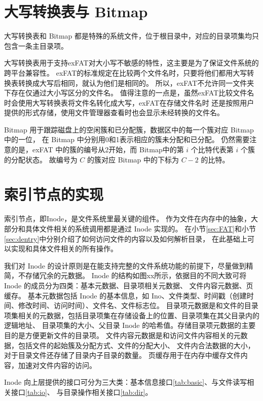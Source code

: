 \section{大写转换表与 Bitmap}
大写转换表和 Bitmap 都是特殊的系统文件，位于根目录中，对应的目录项集均只包含一条主目录项。

大写转换表用于支持exFAT对大小写不敏感的特性，这主要是为了保证文件系统的跨平台兼容性。
exFAT的标准规定在比较两个文件名时，只要将他们都用大写转换表转换成大写后相同，就认为他们是相同的。
所以，exFAT不允许同一文件夹下存在仅通过大小写区分的文件名。
值得注意的一点是，虽然exFAT比较文件名时会使用大写转换表将文件名转化成大写，exFAT在存储文件名时
还是按照用户提供的形式存储，使用文件管理器查看时也会显示未经转换的文件名。

Bitmap 用于跟踪磁盘上的空闲簇和已分配簇，数据区中的每一个簇对应 Bitmap 中的一位，
在 Bitmap 中分别用0和1表示相应的簇未分配和已分配。
仍然需要注意的是，exFAT 中的簇的编号从2开始，而 Bitmap中的第 $ i $ 个比特代表第 $ i $ 个簇的分配状态。
故编号为 $ C $ 的簇对应 Bitmap 中的下标为 $ C - 2 $ 的比特。

\section{索引节点的实现}
索引节点，即Inode，是文件系统里最关键的组件。
作为文件在内存中的抽象，大部分和具体文件相关的系统调用都是通过 Inode 实现的。
在小节\ref{sec:FAT}和小节\ref{sec:dentry}中分别介绍了如何访问文件的内容以及如何解析目录，
在此基础上可以实现和具体文件相关的所有操作。

我们对 Inode 的设计原则是在能支持完整的文件系统功能的前提下，尽量做到精简，不存储冗余的元数据。
Inode 的结构如图xx所示，依据目的不同大致可将 Inode 的成员分为四类：基本元数据、目录项相关元数据、
文件内容元数据、页缓存。
基本元数据包括 Inode 的基本信息，如 Ino、文件类型、时间戳（创建时间、修改时间、访问时间）、文件名、文件标志位。
目录项元数据是和文件的目录项集相关的元数据，包括目录项集在存储设备上的位置、目录项集在其父目录内的逻辑地址、
目录项集的大小、父目录 Inode 的哈希值。存储目录项元数据的主要目的是方便更新文件的目录项。
文件内容元数据是和访问文件内容相关的元数据，包括文件的起始簇及分配方式、文件的分配大小、
文件内合法数据的大小，对于目录文件还存储了目录内子目录的数量。
页缓存用于在内存中缓存文件内容，加速对文件内容的访问。

Inode 向上层提供的接口可分为三大类：基本信息接口\ref{tab:basic}、与文件读写相关接口\ref{tab:io}、
与目录操作相关接口\ref{tab:dir}。

